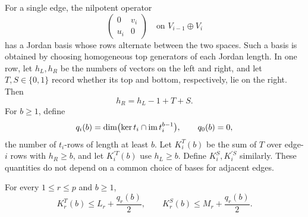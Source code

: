 For a single edge, the nilpotent operator
\[
 \begin{pmatrix}0&v_i\\u_i&0\end{pmatrix}
 \quad\text{on }V_{i-1}\oplus V_i
\]
has a Jordan basis whose rows alternate between the two spaces.
Such a basis is obtained by choosing homogeneous top generators of
each Jordan length.  In one row, let \(h_L,h_R\) be the numbers of
vectors on the left and right, and let \(T,S\in\{0,1\}\) record
whether its top and bottom, respectively, lie on the right.  Then
\begin{equation}\label{tail:row-identity}
 h_R=h_L-1+T+S.
\end{equation}
For \(b\ge1\), define
\[
 q_i(b)=\dim\bigl(\ker t_i\cap\operatorname{im} t_i^{b-1}\bigr),
 \qquad q_0(b)=0,
\]
the number of \(t_i\)-rows of length at least \(b\).  Let
\(K_i^T(b)\) be the sum of \(T\) over edge-\(i\) rows with
\(h_R\ge b\), and let \(K_i^{\prime T}(b)\) use \(h_L\ge b\).
Define \(K_i^S,K_i^{\prime S}\) similarly.  These quantities do not
depend on a common choice of bases for adjacent edges.

\begin{lemma}\label{tail:threshold-bounds}
For every \(1\le r\le p\) and \(b\ge1\),
\begin{equation}\label{tail:threshold-result}
 K_r^T(b)\le L_r+\frac{q_r(b)}2,\qquad
 K_r^S(b)\le M_r+\frac{q_r(b)}2 .
\end{equation}
\end{lemma}

